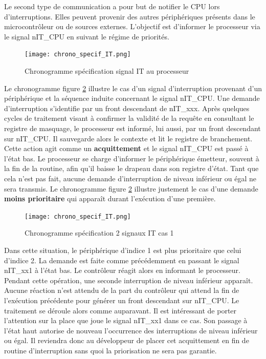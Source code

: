 \gap
Le second type de communication a pour but de notifier le \gls{CPU} lors d'interruptions.
Elles peuvent provenir des autres périphériques présents dans le microcontrôleur ou de sources externes.
L'objectif est d'informer le processeur via le signal nIT\_CPU en suivant le régime de priorités.
\begin{figure}[H]
	\centering
	\texttt{[image: chrono\_specif\_IT.png]}
	\caption{Chronogramme spécification signal IT au processeur}
	\label{fig:spe_IT}
\end{figure}
Le chronogramme figure \ref{fig:spe_IT} illustre le cas d'un signal d'interruption provenant d'un périphérique et la séquence induite concernant le signal nIT\_CPU.
Une demande d'interruption s'identifie par un front descendant de nIT\_xxx. 
Après quelques cycles de traitement visant à confirmer la validité de la requête en consultant le registre de masquage, le processeur est informé, lui aussi, par un front descendant sur nIT\_CPU.
Il sauvegarde alors le contexte et lit le registre de branchement.
Cette action agit comme un \textbf{acquittement} et le signal nIT\_CPU est passé à l'état bas.
Le processeur se charge d'informer le périphérique émetteur, souvent à la fin de la routine, afin qu'il baisse le drapeau dans son registre d'état.
Tant que cela n'est pas fait, aucune demande d'interruption de niveau inférieur ou égal ne sera transmis.
Le chronogramme figure \ref{fig:spe_IT} illustre justement le cas d'une demande \textbf{moins prioritaire} qui apparaît durant l'exécution d'une première.
\begin{figure}[H]
	\centering
	\texttt{[image: chrono\_specif\_IT.png]}
	\caption{Chronogramme spécification 2 signaux IT cas 1}
	\label{fig:spe_IT}
\end{figure}
Dans cette situation, le périphérique d'indice 1 est plus prioritaire que celui d'indice 2. 
La demande est faite comme précédemment en passant le signal nIT\_xx1 à l'état bas.
Le contrôleur réagit alors en informant le processeur.
Pendant cette opération, une seconde interruption de niveau inférieur apparaît.
Aucune réaction n'est attendu de la part du contrôleur qui attend la fin de l'exécution précédente pour générer un front descendant sur nIT\_CPU.
Le traitement se déroule alors comme auparavant.
Il est intéressant de porter l'attention sur la place que joue le signal nIT\_xx1 dans ce cas.
Son passage à l'état haut autorise de nouveau l'occurrence des interruptions de niveau inférieur ou égal.
Il reviendra donc au développeur de placer cet acquittement en fin de routine d'interruption sans quoi la priorisation ne sera pas garantie.
